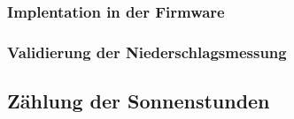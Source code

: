 \subsubsection*{Implentation in der Firmware}
\subsubsection*{Validierung der Niederschlagsmessung}
 

\subsection{Zählung der Sonnenstunden}
